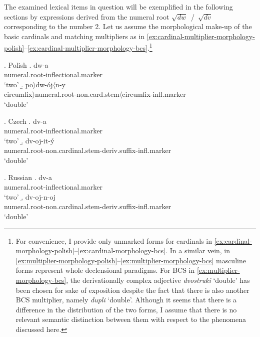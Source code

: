The examined lexical items in question will be exemplified in the following sections by expressions derived from the numeral root $\sqrt{\textit{dw}}$~/~$\sqrt{\textit{dv}}$ corresponding to the number 2. Let us assume the morphological make-up of the basic cardinals and matching multipliers as in \ref{ex:cardinal-multiplier-morphology-polish}--\ref{ex:cardinal-multiplier-morphology-bcs}.\footnote{For convenience, I provide only unmarked forms for cardinals in \ref{ex:cardinal-morphology-polish}--\ref{ex:cardinal-morphology-bcs}. In a similar vein, in \ref{ex:multiplier-morphology-polish}--\ref{ex:multiplier-morphology-bcs} masculine forms represent whole declensional paradigms. For BCS in \ref{ex:multiplier-morphology-bcs}, the derivationally complex adjective \textit{dvostruki} `double' has been chosen for sake of exposition despite the fact that there is also another BCS multiplier, namely \textit{dupli} `double'. Although it seems that there is a difference in the distribution of the two forms, I assume that there is no relevant semantic distinction between them with respect to the phenomena discussed here.}

\ex. Polish\label{ex:cardinal-multiplier-morphology-polish}
\a. dw-a\\
numeral.root-inflectional.marker\\
`two'\label{ex:cardinal-morphology-polish}
\b. po$\rangle$dw-ój$\langle$n-y\\
circumfix$\rangle$numeral.root-non.card.stem$\langle$circumfix-infl.marker\\
`double'\label{ex:multiplier-morphology-polish}

\ex. Czech\label{ex:cardinal-multiplier-morphology-czech}
\a. dv-a\\
numeral.root-inflectional.marker\\
`two'\label{ex:cardinal-morphology-czech}
\b. dv-oj-it-ý\\
numeral.root-non.cardinal.stem-deriv.suffix-infl.marker\\
`double'\label{ex:multiplier-morphology-czech}

\ex. Russian\label{ex:cardinal-multiplier-morphology-russian}
\a. dv-a\\
numeral.root-inflectional.marker\\
`two'\label{ex:cardinal-morphology-russian}
\b. dv-oj-n-oj\\
numeral.root-non.cardinal.stem-deriv.suffix-infl.marker\\
`double'\label{ex:multiplier-morphology-russian}

